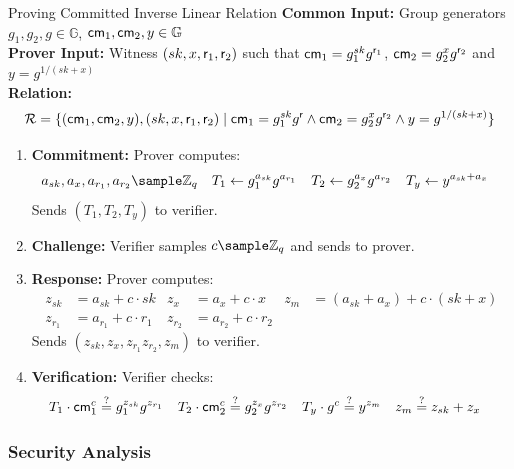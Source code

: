 \begin{protocol}{Proving Committed Inverse Linear Relation}{}\label{pok-committed-inverse-linear-relation}
\textbf{Common Input:} Group generators $g_1, g_2, g \in \mathbb{G}$, $\mathsf{cm}_1, \mathsf{cm}_2, y \in \mathbb{G}$ \\
\textbf{Prover Input:} Witness $(sk, x, \mathsf{r}_1, \mathsf{r}_2)$ such that $\mathsf{cm}_1 = g_1^{sk} g^{\mathsf{r}_1}$, $\mathsf{cm}_2 = g_2^{x}g^{\mathsf{r}_2}$ and $ y = g^{1/(sk + x)}$ \\
\textbf{Relation: }
\[
\mathcal{R} = \{(\mathsf{cm}_1,\mathsf{cm}_2, y), (sk, x, \mathsf{r}_1, \mathsf{r}_2) \mid \mathsf{cm}_1 = g_1^{sk} g^{\mathsf{r}} \wedge \mathsf{cm}_2 = g_2^{x}g^{\mathsf{r}_2} \wedge y = g^{1/(sk + x)}\}
\]
\begin{enumerate}
    \item \textbf{Commitment:} Prover computes:
    \begin{align*}
        a_{sk}, a_x, a_{r_1}, a_{r_2} &\sample \Z_q & T_1 &\gets g_1^{a_{sk}} g^{a_{r_1}} & T_2 &\gets g_2^{a_x} g^{a_{r_2}} & T_y &\gets y^{a_{sk} + a_x}
    \end{align*}
    Sends $(T_1, T_2, T_y)$ to verifier.
    
    \item \textbf{Challenge:} Verifier samples $c \sample \mathbb{Z}_q$ and sends to prover.
    
    \item \textbf{Response:} Prover computes:
     \begin{align*}
        z_{sk} &= a_{sk} + c \cdot sk & z_x &= a_x + c \cdot x &  z_m &= (a_{sk} + a_x) + c \cdot (sk + x)\\   
        z_{r_1} &= a_{r_1} + c \cdot r_1 & z_{r_2} &= a_{r_2} + c \cdot r_2
    \end{align*}
    Sends $(z_{sk}, z_x, z_{r_1} z_{r_2}, z_m)$ to verifier.
    
    \item \textbf{Verification:} Verifier checks:
    \begin{align*}
        T_1 \cdot \mathsf{cm}_1^c &\stackrel{?}{=} g_1^{z_{sk}}g^{z_{r_1}} 
        &
        T_2 \cdot \mathsf{cm}_2^c &\stackrel{?}{=}  g_2^{z_x} g^{z_{r_2}} 
        &
        T_y \cdot g^c &\stackrel{?}{=} y^{z_m} &
        z_m &\stackrel{?}{=} z_{sk} + z_x
    \end{align*}
\end{enumerate}
\end{protocol}


\subsubsection{Security Analysis}

